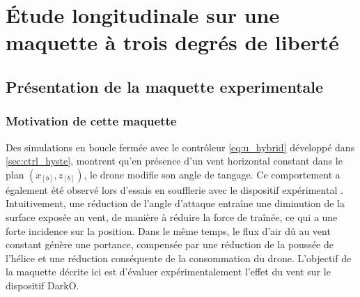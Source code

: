 \chapter{Étude longitudinale sur une maquette à trois degrés de liberté}
\minitoc
\label{chap:3DOF}

\section{Présentation de la maquette experimentale}
\label{sec:test_bench}
\subsection{Motivation de cette maquette}
\label{subsec:motivation}

Des simulations en boucle fermée avec le contrôleur \eqref{eq:u_hybrid} développé dans \ref{sec:ctrl_hyste}, montrent qu'en présence d'un vent horizontal constant dans le plan $(x_{[b]},z_{[b]})$, le drone modifie son angle de tangage. Ce comportement a également été observé lors d'essais en soufflerie avec le dispositif expérimental \cite{olszaneckibarthHal-02542982}. Intuitivement, une réduction de l'angle d'attaque entraîne une diminution de la surface exposée au vent, de manière à réduire la force de traînée, ce qui a une forte incidence sur la position. Dans le même temps, le flux d'air dû au vent constant génère une portance, compensée par une réduction de la poussée de l'hélice et une réduction conséquente de la consommation du drone. L'objectif de la maquette décrite ici est d'évaluer expérimentalement l'effet du vent sur le dispositif DarkO.

